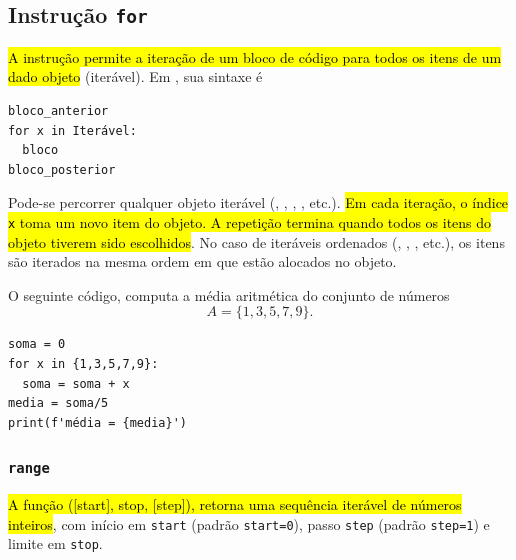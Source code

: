 \subsection{Instrução \texttt{for}}

\hl{A instrução {\PYTHONfor} permite a iteração de um bloco de código para todos os itens de um dado objeto} (iterável). Em {\python}, sua sintaxe é

\begin{lstlisting}
bloco_anterior
for x in Iterável:
  bloco
bloco_posterior
\end{lstlisting}

Pode-se percorrer qualquer objeto iterável ({\PYTHONset}, {\PYTHONtuple}, {\PYTHONlist}, {\PYTHONdict}, etc.). \hl{Em cada iteração, o índice \texttt{x} toma um novo item do objeto. A repetição termina quando todos os itens do objeto tiverem sido escolhidos}. No caso de iteráveis ordenados ({\PYTHONtuple}, {\PYTHONlist}, {\PYTHONdict}, etc.), os itens são iterados na mesma ordem em que estão alocados no objeto.

\begin{ex}\label{cap_progest_sec_repete:ex:media_for}
  O seguinte código, computa a média aritmética do conjunto de números
  \begin{equation}
    A = \{1, 3, 5, 7, 9\}.
  \end{equation}

\begin{lstlisting}
soma = 0
for x in {1,3,5,7,9}:
  soma = soma + x
media = soma/5
print(f'média = {media}')
\end{lstlisting}

\end{ex}

\subsubsection{\texttt{range}}

\hl{A função {\PYTHONrange}([start], stop, [step]), retorna uma sequência iterável de números inteiros}, com início em \lstinline+start+ (padrão \lstinline+start=0+), passo \lstinline+step+ (padrão \lstinline+step=1+) e limite em \lstinline+stop+.

